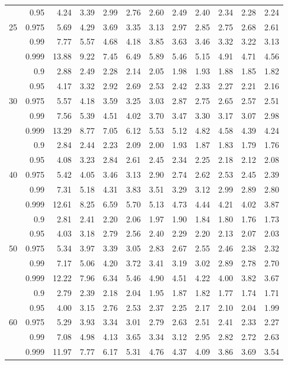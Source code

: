 \documentclass[12pt,a4paper,openany,twoside]{report}
\theoremstyle{definition}
\theoremstyle{remark}
\theoremstyle{plain}
\theoremstyle{definition}
\theoremstyle{definition}
\theoremstyle{definition}
\theoremstyle{remark}
\begin{document}
\begin{center}
\begin{tabular}{rr@{\ \ }r@{\ \ }r@{\ \ }r@{\ \ }r@{\ \ }r@{\ \ }r@{\ \ }r@{\ \ }r@{\ \ }r@{\ \ }r@{ }}
 & 0.95 & 4.24 & 3.39 & 2.99 & 2.76 & 2.60 & 2.49 & 2.40 & 2.34 & 2.28 & 2.24\\
25 & 0.975 & 5.69 & 4.29 & 3.69 & 3.35 & 3.13 & 2.97 & 2.85 & 2.75 & 2.68 & 2.61\\
 & 0.99 & 7.77 & 5.57 & 4.68 & 4.18 & 3.85 & 3.63 & 3.46 & 3.32 & 3.22 & 3.13\\
 & 0.999 & 13.88 & 9.22 & 7.45 & 6.49 & 5.89 & 5.46 & 5.15 & 4.91 & 4.71 & 4.56\\
\rule{0pt}{2.5ex} & 0.9 & 2.88 & 2.49 & 2.28 & 2.14 & 2.05 & 1.98 & 1.93 & 1.88 & 1.85 & 1.82\\
 & 0.95 & 4.17 & 3.32 & 2.92 & 2.69 & 2.53 & 2.42 & 2.33 & 2.27 & 2.21 & 2.16\\
30 & 0.975 & 5.57 & 4.18 & 3.59 & 3.25 & 3.03 & 2.87 & 2.75 & 2.65 & 2.57 & 2.51\\
 & 0.99 & 7.56 & 5.39 & 4.51 & 4.02 & 3.70 & 3.47 & 3.30 & 3.17 & 3.07 & 2.98\\
 & 0.999 & 13.29 & 8.77 & 7.05 & 6.12 & 5.53 & 5.12 & 4.82 & 4.58 & 4.39 & 4.24\\
\rule{0pt}{2.5ex} & 0.9 & 2.84 & 2.44 & 2.23 & 2.09 & 2.00 & 1.93 & 1.87 & 1.83 & 1.79 & 1.76\\
 & 0.95 & 4.08 & 3.23 & 2.84 & 2.61 & 2.45 & 2.34 & 2.25 & 2.18 & 2.12 & 2.08\\
40 & 0.975 & 5.42 & 4.05 & 3.46 & 3.13 & 2.90 & 2.74 & 2.62 & 2.53 & 2.45 & 2.39\\
 & 0.99 & 7.31 & 5.18 & 4.31 & 3.83 & 3.51 & 3.29 & 3.12 & 2.99 & 2.89 & 2.80\\
 & 0.999 & 12.61 & 8.25 & 6.59 & 5.70 & 5.13 & 4.73 & 4.44 & 4.21 & 4.02 & 3.87\\
\rule{0pt}{2.5ex} & 0.9 & 2.81 & 2.41 & 2.20 & 2.06 & 1.97 & 1.90 & 1.84 & 1.80 & 1.76 & 1.73\\
 & 0.95 & 4.03 & 3.18 & 2.79 & 2.56 & 2.40 & 2.29 & 2.20 & 2.13 & 2.07 & 2.03\\
50 & 0.975 & 5.34 & 3.97 & 3.39 & 3.05 & 2.83 & 2.67 & 2.55 & 2.46 & 2.38 & 2.32\\
 & 0.99 & 7.17 & 5.06 & 4.20 & 3.72 & 3.41 & 3.19 & 3.02 & 2.89 & 2.78 & 2.70\\
 & 0.999 & 12.22 & 7.96 & 6.34 & 5.46 & 4.90 & 4.51 & 4.22 & 4.00 & 3.82 & 3.67\\
\rule{0pt}{2.5ex} & 0.9 & 2.79 & 2.39 & 2.18 & 2.04 & 1.95 & 1.87 & 1.82 & 1.77 & 1.74 & 1.71\\
 & 0.95 & 4.00 & 3.15 & 2.76 & 2.53 & 2.37 & 2.25 & 2.17 & 2.10 & 2.04 & 1.99\\
60 & 0.975 & 5.29 & 3.93 & 3.34 & 3.01 & 2.79 & 2.63 & 2.51 & 2.41 & 2.33 & 2.27\\
 & 0.99 & 7.08 & 4.98 & 4.13 & 3.65 & 3.34 & 3.12 & 2.95 & 2.82 & 2.72 & 2.63\\
 & 0.999 & 11.97 & 7.77 & 6.17 & 5.31 & 4.76 & 4.37 & 4.09 & 3.86 & 3.69 & 3.54\\
\end{tabular}
\end{center}
\end{document}
